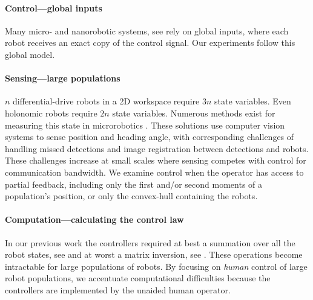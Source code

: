  \paragraph{Control---global inputs}
 Many micro- and nanorobotic systems, see \cite{Tottori2012,Shirai2005,Chiang2011,Donald2006,Donald2008,Takahashi2006,Floyd2011,Diller2013,Frutiger2008,Peyer2013}
   rely on global inputs, where each robot receives an exact copy of the control signal.  Our experiments follow this global model.
  
 \paragraph{Sensing---large populations}
$n$ differential-drive robots in a 2D workspace require $3n$ state variables. Even holonomic robots require $2n$ state variables. Numerous methods exist for measuring this state in microrobotics \cite{Peyer2013,Chiang2011,martel2014computer}.  These solutions use computer vision systems to sense position and heading angle, with corresponding challenges of handling missed detections and image registration between detections and robots.  These challenges increase at small scales where sensing competes with control for communication bandwidth.   We examine control when the operator has access to partial feedback, including only the first and/or second moments of a population's position, or only the convex-hull containing the robots.
 
\paragraph{Computation---calculating the control law}
In our previous work the controllers required at best a summation over all the robot states, see \cite{Becker2012k} and at worst a matrix inversion, see \cite{Becker2012}. 
These operations become intractable for large populations of robots. By focusing on \emph{human} control of large robot populations, we accentuate computational difficulties because the controllers are implemented by the unaided human operator. %


